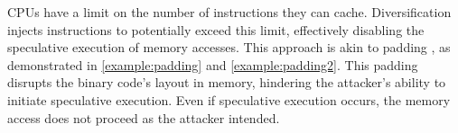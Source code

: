 


 CPUs have a limit on the number of instructions they can cache. 
Diversification injects instructions to potentially exceed this limit, effectively disabling the speculative execution of memory accesses. 
This approach is akin to padding \cite{padding}, as demonstrated in \autoref{example:padding} and \autoref{example:padding2}.
This padding disrupts the binary code's layout in memory, hindering the attacker's ability to initiate speculative execution. 
Even if speculative execution occurs, the memory access does not proceed as the attacker intended.





